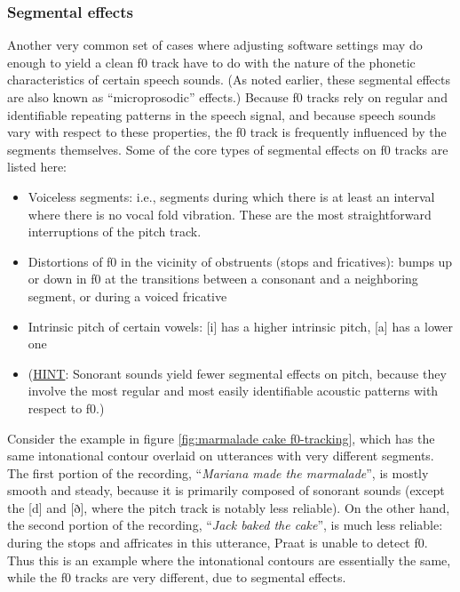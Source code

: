 \documentclass[11pt, twoside]{memoir}
\def\langtext#1{\textit{#1}}
\begin{document}
\subsubsection{Segmental effects}\label{sec:segmental-effects}
Another very common set of cases where adjusting software settings may do enough to yield a clean f0 track have to do with the nature of the phonetic characteristics of certain speech sounds. (As noted earlier, these segmental effects are also known as “microprosodic” effects.) Because f0 tracks rely on regular and identifiable repeating patterns in the speech signal, and because speech sounds vary with respect to these properties, the f0 track is frequently influenced by the segments themselves. Some of the core types of segmental effects on f0 tracks are listed here:
\begin{itemize}
\item Voiceless segments: i.e., segments during which there is at least an interval where there is no vocal fold vibration. These are the most straightforward interruptions of the pitch track.
\item Distortions of f0 in the vicinity of obstruents (stops and fricatives): bumps up or down in f0 at the transitions between a consonant and a neighboring segment, or during a voiced fricative
\item Intrinsic pitch of certain vowels: [i] has a higher intrinsic pitch, [a] has a lower one 
\item[] (\uline{HINT}: Sonorant sounds yield fewer segmental effects on pitch, because they involve the most regular and most easily identifiable acoustic patterns with respect to f0.)
\end{itemize}
Consider the example in figure \ref{fig:marmalade cake f0-tracking}, which has the same intonational contour overlaid on utterances with very different segments. The first portion of the recording, “\langtext{Mariana made the marmalade}”, is mostly smooth and steady, because it is primarily composed of sonorant sounds (except the [d] and [ð], where the pitch track is notably less reliable). On the other hand, the second portion of the recording, “\langtext{Jack baked the cake}”, is much less reliable: during the stops and affricates in this utterance, Praat is unable to detect f0. Thus this is an example where the intonational contours are essentially the same, while the f0 tracks are very different, due to segmental effects.
\end{document}
